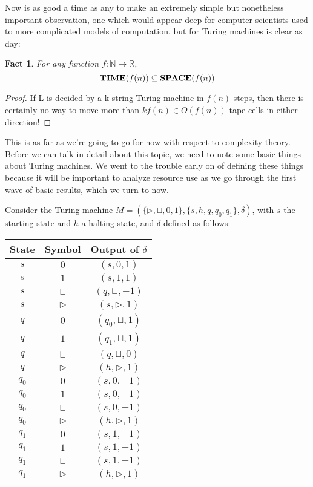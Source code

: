 \documentclass{article}
\theoremstyle{definition}
\theoremstyle{plain}
\theoremstyle{theorem}
\newtheorem{fact}{Fact}[section]
\begin{document}
Now is as good a time as any to make an extremely simple but nonetheless important observation, one which would appear deep for computer scientists used to more complicated models of computation, but for Turing machines is clear as day:
\begin{fact}
For any function $f:\mathbb{N} \to \mathbb{R}$, 
\[\textrm{\textbf{TIME}}(f(n)) \subseteq \textrm{\textbf{SPACE}}(f(n)) \]
\end{fact}
\begin{proof}
If L is decided by a k-string Turing machine in $f(n)$ steps, then there is certainly no way to move more than $kf(n) \in O(f(n))$ tape cells in either direction!
\end{proof}
This is as far as we're going to go for now with respect to complexity theory. Before we can talk in detail about this topic, we need to note some basic things about Turing machines. We went to the trouble early on of defining these things because it will be important to analyze resource use as we go through the first wave of basic results, which we turn to now. \par 
Consider the Turing machine $M = (\{\triangleright,\sqcup,0,1\},\{s,h,q,q_0,q_1\},\delta)$, with $s$ the starting state and $h$ a halting state, and $\delta$ defined as follows:
\begin{center}
\begin{tabular}{ |c c|c| } 
 \hline
 State & Symbol & Output of $\delta$ \\ 
 \hline
 $s$ & $0$ & $(s,0,1)$ \\ 
 $s$ & $1$ & $(s,1,1)$ \\ 
 $s$ & $\sqcup$ & $(q,\sqcup,-1)$ \\
 $s$ & $\triangleright$ & $(s,\triangleright,1)$ \\
 $q$ & $0$ & $(q_0,\sqcup,1)$ \\
 $q$ & $1$ & $(q_1,\sqcup,1)$ \\
 $q$ & $\sqcup$ & $(q,\sqcup,0)$ \\
 $q$ & $\triangleright$ & $(h,\triangleright,1)$ \\
 $q_0$ & $0$ & $(s,0,-1)$ \\
 $q_0$ & $1$ & $(s,0,-1)$ \\
 $q_0$ & $\sqcup$ & $(s,0,-1)$ \\
 $q_0$ & $\triangleright$ & $(h,\triangleright,1)$ \\
 $q_1$ & $0$ & $(s,1,-1)$ \\
 $q_1$ & $1$ & $(s,1,-1)$ \\
 $q_1$ & $\sqcup$ & $(s,1,-1)$ \\
 $q_1$ & $\triangleright$ & $(h,\triangleright,1)$ \\
 \hline
\end{tabular}
\end{center}
\end{document}
